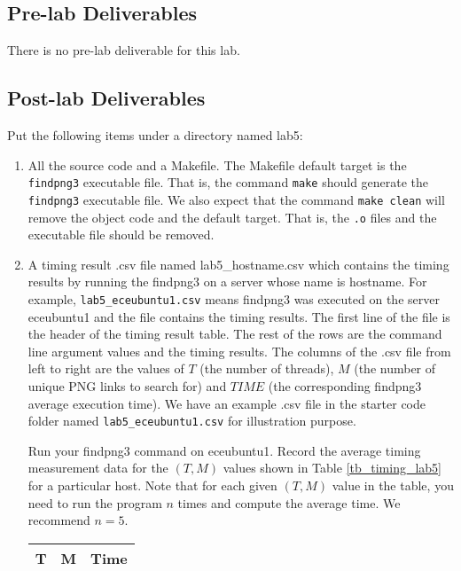 \subsection{Pre-lab Deliverables}
There is no pre-lab deliverable for this lab.

\subsection{Post-lab Deliverables}
\label{sec:lab5:postlab}
Put the following items under a directory named lab5:
\begin{enumerate}
\item All the source code and a Makefile. The Makefile default target is the \verb+findpng3+ executable file. That is, the command \verb+make+ should generate the \verb+findpng3+ executable file. We also expect that the command \verb+make clean+ will remove the object code and the default target. That is, the \verb+.o+ files and the executable file should be removed.
\item A timing result .csv file named lab5\_hostname.csv 
  which contains the timing results by running the findpng3 on a server whose name is hostname. For example, \verb+lab5_eceubuntu1.csv+ means findpng3 was executed on the server eceubuntu1 and the file contains the timing results.
  The first line of the file is the header of the timing result table. The rest of the rows are the command line argument values and the timing results. The columns of the .csv file from left to right are the values of $T$ (the number of threads), $M$ (the number of unique PNG links to search for) and $TIME$ (the corresponding findpng3 average execution time). We have an example .csv file in the starter code folder named \verb+lab5_eceubuntu1.csv+ for illustration purpose.

  Run your findpng3 command on eceubuntu1. Record the average timing measurement data for the $(T, M)$ values shown in Table \ref{tb_timing_lab5} for a particular host. Note that for each given $(T, M)$ value in the table, you need to run the program $n$ times and compute the average time. We recommend $n=5$.
\begin{table}[h]
\begin{center}
\begin{tabular}{|c|c|c|}
\hline
T     & M    & Time \\ \hline


\end{tabular}
\end{center}
\end{table}
\end{enumerate}
